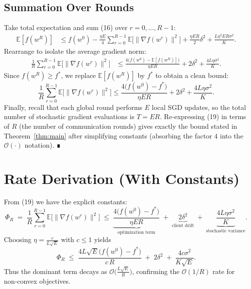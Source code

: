 \documentclass{article}
\newcommand{\EE}{\mathbb{E}}
\begin{document}
\subsection*{Summation Over Rounds}
Take total expectation and sum (16) over $r=0,\dots,R-1$:
\begin{align}
\EE[f(w^{R})]
 &\le f(w^{0})
    -\frac{\eta E}{4}\sum_{r=0}^{R-1}\EE\!\big[\|\nabla f(w^{r})\|^{2}\big]
    +\frac{\eta E R}{2}\delta^{2}
    +\frac{L\eta^{2}E R\sigma^{2}}{K}. \tag{17}
\end{align}
Rearrange to isolate the average gradient norm:
\begin{align}
\frac{1}{R}\sum_{r=0}^{R-1}\EE\!\big[\|\nabla f(w^{r})\|^{2}\big]
 &\le
    \frac{4\big(f(w^{0})-\EE[f(w^{R})]\big)}{\eta E R}
    +2\delta^{2}
    +\frac{4L\eta\sigma^{2}}{K}. \tag{18}
\end{align}
Since $f(w^{R})\ge f^{*}$, we replace $\EE[f(w^{R})]$ by $f^{*}$ to obtain a clean bound:
\[
    \frac{1}{R}\sum_{r=0}^{R-1}\EE\!\big[\|\nabla f(w^{r})\|^{2}\big]
 \le
    \frac{4\big(f(w^{0})-f^{*}\big)}{\eta E R}
    +2\delta^{2}
    +\frac{4L\eta\sigma^{2}}{K}. \tag{19}
\]
Finally, recall that each global round performs $E$ local SGD updates, so the total number of stochastic gradient evaluations is $T=ER$. Re‑expressing (19) in terms of $R$ (the number of communication rounds) gives exactly the bound stated in Theorem~\ref{thm:main} after simplifying constants (absorbing the factor $4$ into the $\mathcal O(\cdot)$ notation). ∎

\section*{Rate Derivation (With Constants)}
From (19) we have the explicit constants:
\[
\Phi_R\;=\;\frac{1}{R}\sum_{r=0}^{R-1}\EE\!\big[\|\nabla f(w^{r})\|^{2}\big]
\;\le\;
\underbrace{\frac{4\big(f(w^{0})-f^{*}\big)}{\eta E R}}_{\text{optimization term}}
\;+\;
\underbrace{2\delta^{2}}_{\text{client drift}}
\;+\;
\underbrace{\frac{4L\eta\sigma^{2}}{K}}_{\text{stochastic variance}} .
\]
Choosing $\eta = \frac{c}{L\sqrt{E}}$ with $c\le 1$ yields
\[
\Phi_R \;\le\;
\frac{4L\sqrt{E}\big(f(w^{0})-f^{*}\big)}{c\,R}
\;+\;
2\delta^{2}
\;+\;
\frac{4c\sigma^{2}}{K\sqrt{E}} .
\]
Thus the dominant term decays as $\mathcal O\!\big(\frac{L\sqrt{E}}{R}\big)$, confirming the $\mathcal O(1/R)$ rate for non‑convex objectives.
\end{document}
